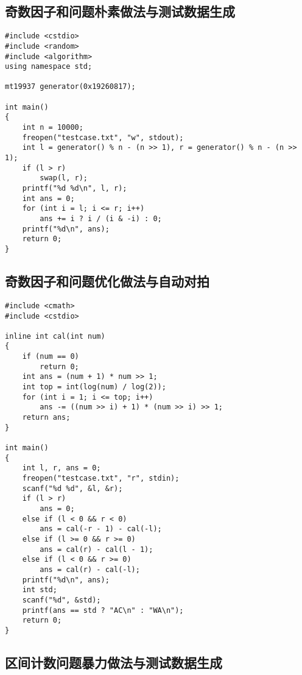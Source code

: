 \documentclass{article}
\begin{document}
\subsection{奇数因子和问题朴素做法与测试数据生成}

\begin{lstlisting}
#include <cstdio>
#include <random>
#include <algorithm>
using namespace std;

mt19937 generator(0x19260817);

int main()
{
    int n = 10000;
    freopen("testcase.txt", "w", stdout);
    int l = generator() % n - (n >> 1), r = generator() % n - (n >> 1);
    if (l > r)
        swap(l, r);
    printf("%d %d\n", l, r);
    int ans = 0;
    for (int i = l; i <= r; i++)
        ans += i ? i / (i & -i) : 0;
    printf("%d\n", ans);
    return 0;
}
\end{lstlisting}

\subsection{奇数因子和问题优化做法与自动对拍}

\begin{lstlisting}
#include <cmath>
#include <cstdio>

inline int cal(int num)
{
    if (num == 0)
        return 0;
    int ans = (num + 1) * num >> 1;
    int top = int(log(num) / log(2));
    for (int i = 1; i <= top; i++)
        ans -= ((num >> i) + 1) * (num >> i) >> 1;
    return ans;
}

int main()
{
    int l, r, ans = 0;
    freopen("testcase.txt", "r", stdin);
    scanf("%d %d", &l, &r);
    if (l > r)
        ans = 0;
    else if (l < 0 && r < 0)
        ans = cal(-r - 1) - cal(-l);
    else if (l >= 0 && r >= 0)
        ans = cal(r) - cal(l - 1);
    else if (l < 0 && r >= 0)
        ans = cal(r) - cal(-l);
    printf("%d\n", ans);
    int std;
    scanf("%d", &std);
    printf(ans == std ? "AC\n" : "WA\n");
    return 0;
}
\end{lstlisting}

\subsection{区间计数问题暴力做法与测试数据生成}
\end{document}
